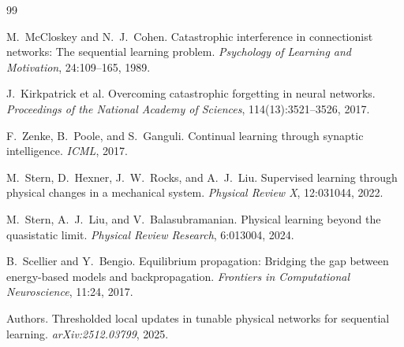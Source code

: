 \documentclass[11pt]{article}
\begin{document}
\begin{thebibliography}{99}

M.\ McCloskey and N.\ J.\ Cohen.
\newblock Catastrophic interference in connectionist networks: The sequential
learning problem.
\newblock \emph{Psychology of Learning and Motivation}, 24:109--165, 1989.

J.\ Kirkpatrick et al.
\newblock Overcoming catastrophic forgetting in neural networks.
\newblock \emph{Proceedings of the National Academy of Sciences},
114(13):3521--3526, 2017.

F.\ Zenke, B.\ Poole, and S.\ Ganguli.
\newblock Continual learning through synaptic intelligence.
\newblock \emph{ICML}, 2017.

M.\ Stern, D.\ Hexner, J.\ W.\ Rocks, and A.\ J.\ Liu.
\newblock Supervised learning through physical changes in a mechanical system.
\newblock \emph{Physical Review X}, 12:031044, 2022.

M.\ Stern, A.\ J.\ Liu, and V.\ Balasubramanian.
\newblock Physical learning beyond the quasistatic limit.
\newblock \emph{Physical Review Research}, 6:013004, 2024.

B.\ Scellier and Y.\ Bengio.
\newblock Equilibrium propagation: Bridging the gap between energy-based
models and backpropagation.
\newblock \emph{Frontiers in Computational Neuroscience}, 11:24, 2017.

Authors.
\newblock Thresholded local updates in tunable physical networks for
sequential learning.
\newblock \emph{arXiv:2512.03799}, 2025.

\end{thebibliography}
\end{document}
